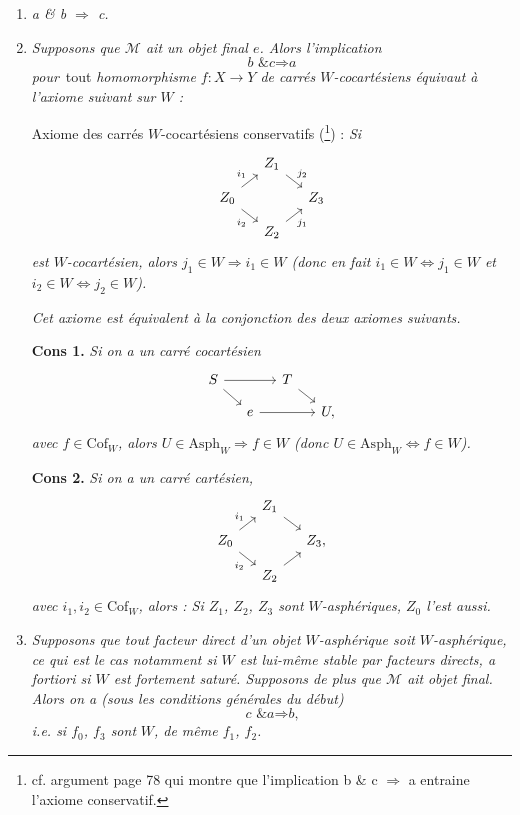 \documentclass[11pt]{article}
\newcommand{\printedpage}[1]{\marginpar{\footnotesize p.~#1}}
\newcommand{\msp}[1]{\marginpar{\footnotesize [#1]}}
\newcommand{\Cof}{\mathrm{Cof}}
\newcommand{\Asph}{\mathrm{Asph}}
\begin{document}
\begin{enumerate}
\item[\textit{1°)}] \textit{a \& b $\Longrightarrow$ c.}

\msp{page 273}

\item[\textit{2°)}] \textit{Supposons que $\mathcal{M}$ ait un objet final $e$. Alors l'implication}
\[
\textit{b \& c} \Longrightarrow \textit{a}
\]
\textit{pour}~tout \textit{homomorphisme $f : X \longrightarrow Y$ de carrés $W$-cocartésiens équivaut à l'axiome suivant sur $W$ :}

Axiome des carrés $W$-cocartésiens conservatifs (\footnote{cf. argument page 78 qui montre que l'implication b \& c $\Longrightarrow$ a entraine l'axiome conservatif.}) : \textit{Si}
\[
\begin{tikzcd}[ampersand replacement=\&, column sep=small, row sep=small]
 \& Z_1 \arrow[dr, "j_2"] \& \\
Z_0 \arrow[ur, "i_1"] \arrow[dr, "i_2"'] \& \& Z_3 \\
 \& Z_2 \arrow[ur, "j_1"'] \&
\end{tikzcd}
\]
\textit{est $W$-cocartésien, alors $j_1 \in W \Longrightarrow i_1 \in W$ (donc en fait $i_1 \in W \Longleftrightarrow j_1 \in W$ et $i_2 \in W \Longleftrightarrow j_2 \in W$).}

\textit{Cet axiome est équivalent à la conjonction des deux axiomes suivants.}

\textbf{Cons 1.} \textit{Si on a un carré cocartésien}
\printedpage{178}
\[
\begin{tikzcd}[ampersand replacement=\&, column sep=small, row sep=small]
S \arrow[rr] \arrow[dr] \& \& T \arrow[dr] \& \\
 \& e \arrow[rr] \& \& U,
\end{tikzcd}
\]
\textit{avec $f \in \Cof_W$, alors $U \in \Asph_W \Longrightarrow f \in W$ (donc $U \in \Asph_W \Longleftrightarrow f \in W$).}

\textbf{Cons 2.} \textit{Si on a un carré cartésien,}
\[
\begin{tikzcd}[ampersand replacement=\&, column sep=small, row sep=small]
 \& Z_1 \arrow[dr] \& \\
Z_0 \arrow[ur, "i_1"] \arrow[dr, "i_2"'] \& \& Z_3, \\
 \& Z_2 \arrow[ur] \&
\end{tikzcd}
\]
\textit{avec $i_1, i_2 \in \Cof_W$, alors : Si $Z_1$, $Z_2$, $Z_3$ sont $W$-asphériques, $Z_0$ l'est aussi.}

\msp{page 274}

\item[\textit{3°)}] \textit{Supposons que tout facteur direct d'un objet $W$-asphérique soit $W$-asphérique, ce qui est le cas notamment si $W$ est lui-même stable par facteurs directs, a fortiori si $W$ est fortement saturé. Supposons de plus que $\mathcal{M}$ ait} \textit{objet final. Alors on a (sous les conditions générales du début)}
\[
\textit{c \& a} \Longrightarrow \textit{b,}
\]
\textit{i.e. si $f_0$, $f_3$ sont} \textit{$W$, de même $f_1$, $f_2$.}
\end{enumerate}
\end{document}

